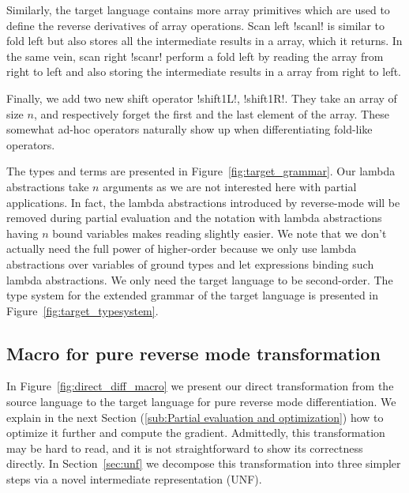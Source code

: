 Similarly, the target language contains more array primitives which are used to define the reverse derivatives of array operations. 
Scan left !scanl! is similar to fold left but also stores all the intermediate results in a array, which it returns.
In the same vein, scan right !scanr! perform a fold left by reading the array from right to left and also storing 
the intermediate results in a array from right to left.

Finally, we add two new shift operator !shift1L!, !shift1R!. 
They take an array of size $n$, and respectively forget the first and the last element of the array.
These somewhat ad-hoc operators naturally show up when differentiating fold-like operators.

The types and terms are presented in Figure~\ref{fig:target_grammar}.
Our lambda abstractions take $n$ arguments as we are not interested here with partial applications. 
In fact, the lambda abstractions introduced by reverse-mode will be removed during partial evaluation 
and the notation with lambda abstractions having $n$ bound variables makes reading slightly easier.
We note that we don't actually need the full power of higher-order because we only use lambda abstractions over variables of ground types
and let expressions binding such lambda abstractions. We only need the target language to be second-order.
The type system for the extended grammar of the target language is presented in Figure~\ref{fig:target_typesystem}. 





\subsection{Macro for pure reverse mode transformation} %
\label{sub:Macro for pure reverse mode transformation}

In Figure~\ref{fig:direct_diff_macro} we present our direct transformation from the source language to the target language for pure reverse mode differentiation.
We explain in the next Section (\ref{sub:Partial evaluation and optimization}) how to optimize it further and compute the gradient.
Admittedly, this transformation may be hard to read, and it is not straightforward to show its correctness directly. 
In Section~\ref{sec:unf} we decompose this transformation into three simpler steps via a novel intermediate representation (UNF).

